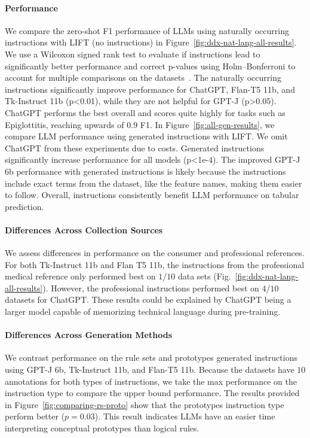 \paragraph{Performance} We compare the zero-shot F1 performance of LLMs using naturally occurring instructions with LIFT (no instructions) in Figure~\ref{fig:ddx-nat-lang-all-results}.
We use a Wilcoxon signed rank test to evaluate if instructions lead to significantly better performance and correct p-values using Holm–Bonferroni to account for multiple comparisons on the datasets~\cite{holm1979simple}. The naturally occurring instructions significantly improve performance for ChatGPT, Flan-T5 11b, and Tk-Instruct 11b (p<0.01), while they are not helpful for GPT-J (p>0.05). ChatGPT performs the best overall and scores quite highly for tasks such as Epiglottitis, reaching upwards of $0.9$ F1. In Figure~\ref{fig:all-gen-results}, we compare LLM performance using generated instructions with LIFT. We omit ChatGPT from these experiments due to costs. Generated instructions significantly increase performance for all models (p<1e-4). The improved GPT-J 6b performance with generated instructions is likely because the instructions include exact terms from the dataset, like the feature names, making them easier to follow. Overall, instructions consistently benefit LLM performance on tabular prediction.

\paragraph{Differences Across Collection Sources} We assess differences in performance on the consumer and professional references. For both Tk-Instruct 11b and Flan T5 11b, the instructions from the professional medical reference only performed best on $1/10$ data sets (Fig.~\ref{fig:ddx-nat-lang-all-results}).
However, the professional instructions performed best on $4/10$ datasets for ChatGPT. These results could be explained by ChatGPT being a larger model capable of memorizing technical language during pre-training.

\paragraph{Differences Across Generation Methods} We contrast performance on the rule sets and prototypes generated instructions using GPT-J 6b, Tk-Instruct 11b, and Flan-T5 11b. Because the datasets have $10$ annotations for both types of instructions, we take the max performance on the instruction type to compare the upper bound performance. The results provided in Figure~\ref{fig:comparing-rs-proto} show that the prototypes instruction type perform better ($p=0.03$). This result indicates LLMs have an easier time interpreting conceptual prototypes than logical rules.

